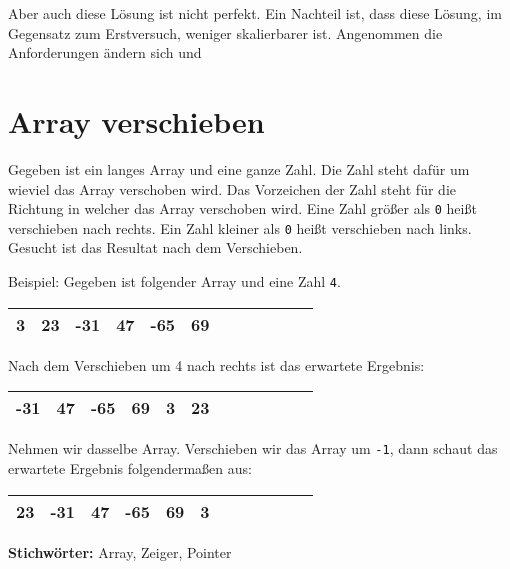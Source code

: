 \documentclass{book}
\begin{document}
Aber auch diese Lösung ist nicht perfekt. Ein Nachteil ist, dass diese Lösung, im Gegensatz zum Erstversuch, weniger skalierbarer ist. Angenommen die Anforderungen ändern sich und 

\section{Array verschieben}
\begin{examplei}
	Gegeben ist ein langes Array und eine ganze Zahl. Die Zahl steht dafür um wieviel das Array verschoben wird. Das Vorzeichen der Zahl steht für die Richtung in welcher das Array verschoben wird. Eine Zahl größer als \lstinline|0| heißt verschieben nach rechts. Ein Zahl kleiner als \lstinline|0| heißt verschieben nach links. Gesucht ist das Resultat nach dem Verschieben.
	
	Beispiel:
	Gegeben ist folgender Array und eine Zahl \lstinline|4|. 	
	
	\begin{tabular}{|l|l|l|l|l|l|l|l|l|l|l|l|} 
		\hline
		3 & 23 & -31 & 47 & -65 & 69 \\
		\hline
	\end{tabular}

	Nach dem Verschieben um 4 nach rechts ist das erwartete Ergebnis:
	
	\begin{tabular}{|l|l|l|l|l|l|l|l|l|l|l|l|} 
		\hline
		\cellcolor{yellow!25}-31 & \cellcolor{yellow!25}47 & \cellcolor{yellow!25}-65 & \cellcolor{yellow!25}69 & 3 & 23 \\
		\hline
	\end{tabular}
	
	Nehmen wir dasselbe Array. Verschieben wir das Array um \lstinline|-1|, dann schaut das erwartete Ergebnis folgendermaßen aus:
	
	\begin{tabular}{|l|l|l|l|l|l|l|l|l|l|l|l|} 
		\hline
		23 & -31 & 47 & -65 & 69 & \cellcolor{yellow!25}3 \\
		\hline
	\end{tabular}
	
\end{examplei}
{\bf Stichwörter:} Array, Zeiger, Pointer
\end{document}
